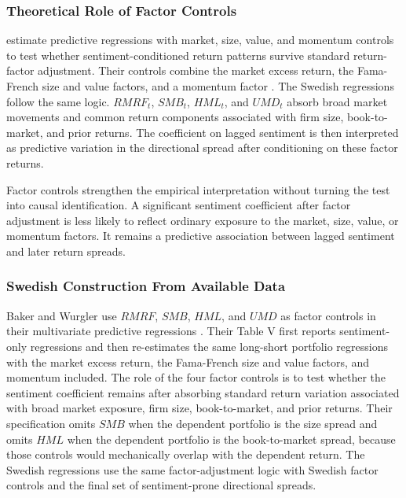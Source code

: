 \documentclass[11pt]{article}
\newcommand{\var}[1]{\ensuremath{#1}}
\begin{document}
\subsubsection{Theoretical Role of Factor Controls}
\citet{baker2006sentiment} estimate predictive regressions with market, size, value, and momentum controls to test whether sentiment-conditioned return patterns survive standard return-factor adjustment. Their controls combine the market excess return, the Fama-French size and value factors, and a momentum factor \citep{fama1993common,carhart1997persistence}. The Swedish regressions follow the same logic. \var{RMRF_t}, \var{SMB_t}, \var{HML_t}, and \var{UMD_t} absorb broad market movements and common return components associated with firm size, book-to-market, and prior returns. The coefficient on lagged sentiment is then interpreted as predictive variation in the directional spread after conditioning on these factor returns.

Factor controls strengthen the empirical interpretation without turning the test into causal identification. A significant sentiment coefficient after factor adjustment is less likely to reflect ordinary exposure to the market, size, value, or momentum factors. It remains a predictive association between lagged sentiment and later return spreads.

\subsubsection{Swedish Construction From Available Data}
Baker and Wurgler use \var{RMRF}, \var{SMB}, \var{HML}, and \var{UMD} as factor controls in their multivariate predictive regressions \citep{baker2006sentiment}. Their Table V first reports sentiment-only regressions and then re-estimates the same long-short portfolio regressions with the market excess return, the Fama-French size and value factors, and momentum included. The role of the four factor controls is to test whether the sentiment coefficient remains after absorbing standard return variation associated with broad market exposure, firm size, book-to-market, and prior returns. Their specification omits \var{SMB} when the dependent portfolio is the size spread and omits \var{HML} when the dependent portfolio is the book-to-market spread, because those controls would mechanically overlap with the dependent return. The Swedish regressions use the same factor-adjustment logic with Swedish factor controls and the final set of sentiment-prone directional spreads.
\end{document}
